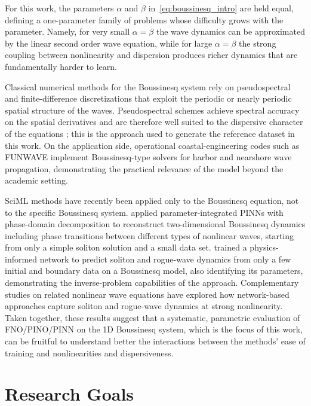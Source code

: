 For this work, the parameters $\alpha$ and $\beta$ in~\eqref{eq:boussinesq_intro} are held equal, defining a one-parameter family of problems whose difficulty grows with the parameter. Namely, for very small $\alpha = \beta$ the wave dynamics can be approximated by the linear second order wave equation, while for large $\alpha = \beta$ the strong coupling between nonlinearity and dispersion produces richer dynamics that are fundamentally harder to learn.

Classical numerical methods for the Boussinesq system rely on pseudospectral and finite-difference discretizations that exploit the periodic or nearly periodic spatial structure of the waves. Pseudospectral \parencite{trefethen2000} schemes achieve spectral accuracy on the spatial derivatives and are therefore well suited to the dispersive character of the equations \parencite{steinmoeller2012}; this is the approach used to generate the reference dataset in this work. On the application side, operational coastal-engineering codes such as FUNWAVE \parencite{funwave2010} implement Boussinesq-type solvers for harbor and nearshore wave propagation, demonstrating the practical relevance of the model beyond the academic setting.

SciML methods have recently been applied only to the Boussinesq equation, not to the specific Boussinesq system. \textcite{zheng2023} applied parameter-integrated PINNs with phase-domain decomposition to reconstruct two-dimensional Boussinesq dynamics including phase transitions between different types of nonlinear waves, starting from only a simple soliton solution and a small data set. \textcite{wang2024} trained a physics-informed network to predict soliton and rogue-wave dynamics from only a few initial and boundary data on a Boussinesq model, also identifying its parameters, demonstrating the inverse-problem capabilities of the approach. Complementary studies on related nonlinear wave equations \parencite{zhang2024, kumar2025} have explored how network-based approaches capture soliton and rogue-wave dynamics at strong nonlinearity. Taken together, these results suggest that a systematic, parametric evaluation of FNO/PINO/PINN on the 1D Boussinesq system, which is the focus of this work, can be fruitful to understand better the interactions between the methods' ease of training and nonlinearities and dispersiveness.

\section{Research Goals}
\label{sec:intro_goals}

